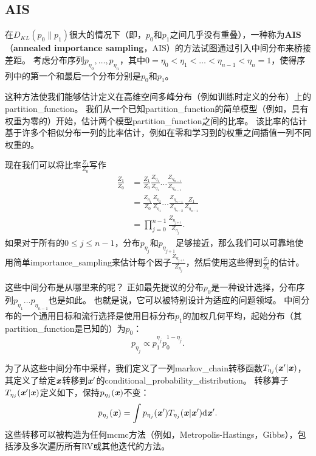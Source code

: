 \subsection{\gls{AIS}}
\label{subsec:annealed_importance_sampling}
在$D_{KL}(p_0 \| p_1)$很大的情况下（即，$p_0$和$p_1$之间几乎没有重叠），一种称为\textbf{\gls{AIS}}（\textbf{annealed importance sampling}，AIS）的方法试图通过引入中间分布来桥接差距\citep{Jarzynski1997,Neal-2001}。
考虑分布序列$p_{\eta_0},\dots,p_{\eta_n}$，其中$0=\eta_0 < \eta_1 < \dots < \eta_{n-1} < \eta_n = 1$，使得序列中的第一个和最后一个分布分别是$p_0$和$p_1$。


这种方法使我们能够估计定义在高维空间多峰分布（例如训练时定义的分布）上的\gls{partition_function}。
我们从一个已知\gls{partition_function}的简单模型（例如，具有权重为零的）开始，估计两个模型\gls{partition_function}之间的比率。
该比率的估计基于许多个相似分布一列的比率估计，例如在零和学习到的权重之间插值一列不同权重的。


现在我们可以将比率$\frac{Z_1}{Z_0}$写作
\begin{align}
\frac{Z_1}{Z_0} &= \frac{Z_1}{Z_0} \frac{Z_{\eta_1}}{Z_{\eta_1}} \dots \frac{Z_{\eta_{n-1}}}{Z_{\eta_{n-1}}} \\
&= \frac{Z_{\eta_1}}{Z_{0}}  \frac{Z_{\eta_2}}{Z_{\eta_1}}  \dots \frac{Z_{\eta_{n-1}}}{Z_{\eta_{n-2}}} \frac{Z_{1}}{Z_{\eta_{n-1}}} \\
&= \prod_{j=0}^{n-1} \frac{ Z_{\eta_{j+1}} }{Z_{\eta_j}}. \label{eq:18.49}
\end{align}
如果对于所有的$0 \leq j \leq n-1$，分布$p_{\eta_j}$和$p_{\eta_{j+1}}$足够接近，那么我们可以可靠地使用简单\gls{importance_sampling}来估计每个因子$\frac{Z_{\eta_{j+1}}}{ Z_{\eta_j}}$，然后使用这些得到$\frac{Z_1}{Z_0}$的估计。


这些中间分布是从哪里来的呢？
正如最先提议的分布$p_0$是一种设计选择，分布序列$p_{\eta_1} \dots p_{\eta_{n-1}}$也是如此。
也就是说，它可以被特别设计为适应的问题领域。
中间分布的一个通用目标和流行选择是使用目标分布$p_1$的加权几何平均，起始分布（其\gls{partition_function}是已知的）为$p_0$：
\begin{equation}
	p_{\eta_j} \propto p_1^{\eta_j} p_0^{1-\eta_j}.
\end{equation}


为了从这些中间分布中采样，我们定义了一列\gls{markov_chain}转移函数$T_{\eta_j}(\boldsymbol{\mathit{x}}' | \boldsymbol{\mathit{x}})$，其定义了给定$\boldsymbol{\mathit{x}}$转移到$\boldsymbol{\mathit{x}}'$的\gls{conditional_probability_distribution}。
转移算子$T_{\eta_j}(\boldsymbol{\mathit{x}}' | \boldsymbol{\mathit{x}})$定义如下，保持$p_{\eta_j}(\boldsymbol{\mathit{x}})$不变：
\begin{equation}
	p_{\eta_j}(\boldsymbol{\mathit{x}}) = \int p_{\eta_j} (\boldsymbol{\mathit{x}}') T_{\eta_j} (\boldsymbol{\mathit{x}} | \boldsymbol{\mathit{x}}') \mathrm{d}\boldsymbol{\mathit{x}}'.
\end{equation}
这些转移可以被构造为任何\gls{mcmc}方法（例如，Metropolis-Hastings，Gibbs），包括涉及多次遍历所有\gls{RV}或其他迭代的方法。


